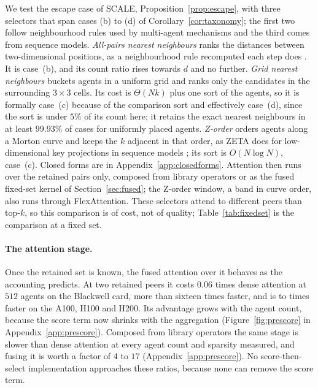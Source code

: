 We test the escape case of SCALE, Proposition~\ref{prop:escape}, with three
selectors that span cases (b) to (d) of Corollary~\ref{cor:taxonomy}; the first
two follow neighbourhood rules used by multi-agent mechanisms and the third
comes from sequence models. \emph{All-pairs nearest neighbours} ranks the
distances between two-dimensional positions, as a neighbourhood rule recomputed
each step does \citep{jiang2018dgn,jiang2018atoc}. It is case~(b), and its
count ratio rises towards $d$ and no further. \emph{Grid nearest neighbours}
buckets agents in a uniform grid and ranks only the candidates in the
surrounding $3 \times 3$ cells. Its cost is $\Theta(Nk)$ plus one sort of the
agents, so it is formally case~(c) because of the comparison sort and
effectively case~(d), since the sort is under $5\%$ of its count here; it
retains the exact nearest neighbours in at least $99.93\%$ of cases for
uniformly placed agents. \emph{Z-order} orders agents along a Morton curve and
keeps the $k$ adjacent in that order, as ZETA does for low-dimensional key
projections in sequence models \citep{zeng2025zeta}; its sort is
$O(N \log N)$, case~(c). Closed forms are in Appendix~\ref{app:closedforms}.
Attention then runs over the retained pairs only, composed from library
operators or as the fused fixed-set kernel of Section~\ref{sec:fused}; the
Z-order window, a band in curve order, also runs through FlexAttention. These
selectors attend to different peers than top-$k$, so this comparison is of
cost, not of quality; Table~\ref{tab:fixedset} is the comparison at a fixed set.

\begin{table}[t]
\centering\small
\caption{Selecting before scoring, at \SelectorsK{} retained peers: selector
latency (ms) and end-to-end latency (selector plus fused attention) divided by
the best dense implementation of the same interleaved sweep. The grid
selector's recall is the fraction of exact nearest neighbours it retains. The
Z-order path is shown on minima and as a ratio of medians, and through
FlexAttention with the window expressed as a band mask. Rows below $N{=}192$
are dominated by per-kernel cost (Section~\ref{sec:smalln}).}
\label{tab:selectors}

\end{table}

\paragraph{The attention stage.} Once the retained set is known, the fused
attention over it behaves as the accounting predicts. At two retained peers it
costs $0.06$ times dense attention at $512$ agents on the Blackwell card, more
than sixteen times faster, and is \PortPreAttnLo{} to \PortPreAttnHi{} times
faster on the A100, H100 and H200. Its advantage grows with the agent count,
because the score term now shrinks with the aggregation
(Figure~\ref{fig:prescore} in Appendix~\ref{app:prescore}). Composed from
library operators the same stage is slower than dense attention at every agent
count and sparsity measured, and fusing it is worth a factor of $4$ to $17$
(Appendix~\ref{app:prescore}). No score-then-select implementation approaches
these ratios, because none can remove the score term.

